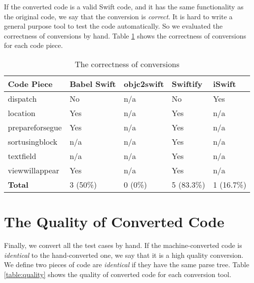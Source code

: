\documentclass{sfuthesis}
\begin{document}
If the converted code is a valid Swift code, and it has the same functionality as the original code, we say that the conversion is \emph{correct}. It is hard to write a general purpose tool to test the code automatically. So we evaluated the correctness of conversions by hand. Table \ref{table:correctness} shows the correctness of conversions for each code piece.

\begin{table}[H]
\begin{center}
\caption{The correctness of conversions}
\begin{tabular}{|l|l|l|l|l|}
\hline
\textbf{Code Piece} & Babel Swift & objc2swift & Swiftify & iSwift \\
\hline
dispatch        & No  & n/a & No  & Yes \\
location        & Yes & n/a & Yes & n/a \\
prepareforsegue & Yes & n/a & Yes & n/a \\
sortusingblock  & n/a & n/a & Yes & n/a \\
textfield       & n/a & n/a & Yes & n/a \\
viewwillappear  & Yes & n/a & Yes & n/a \\
\hline
\textbf{Total}  & 3 (50\%) & 0 (0\%) & 5 (83.3\%) & 1 (16.7\%) \\
\hline
\end{tabular}
\end{center}
\label{table:correctness}
\end{table}

\section{The Quality of Converted Code}

Finally, we convert all the test cases by hand. If the machine-converted code is \emph{identical} to the hand-converted one, we say that it is a high quality conversion. We define two pieces of code are \emph{identical} if they have the same parse tree. Table \ref{table:quality} shows the quality of converted code for each conversion tool.
\end{document}
